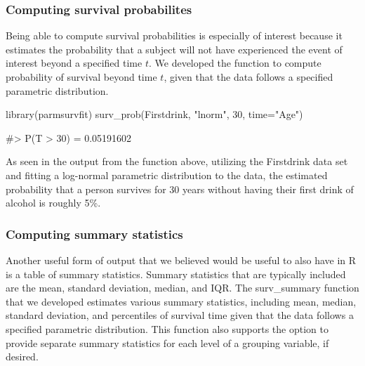 \hypertarget{computing-survival-probabilites}{%
\subsubsection{Computing survival
probabilites}\label{computing-survival-probabilites}}

Being able to compute survival probabilities is especially of interest
because it estimates the probability that a subject will not have
experienced the event of interest beyond a specified time \(t\). We
developed the function  to compute probability of
survival beyond time \(t\), given that the data follows a specified
parametric distribution.

\begin{Schunk}
\begin{Sinput}
library(parmsurvfit)
surv_prob(Firstdrink, "lnorm", 30, time="Age")
\end{Sinput}
\begin{Soutput}
#> P(T > 30) = 0.05191602
\end{Soutput}
\end{Schunk}

As seen in the output from the function above, utilizing the Firstdrink
data set and fitting a log-normal parametric distribution to the data,
the estimated probability that a person survives for 30 years without
having their first drink of alcohol is roughly 5\%.

\hypertarget{computing-summary-statistics}{%
\subsubsection{Computing summary
statistics}\label{computing-summary-statistics}}

Another useful form of output that we believed would be useful to also
have in R is a table of summary statistics. Summary statistics that are
typically included are the mean, standard deviation, median, and IQR.
The surv\_summary function that we developed estimates various summary
statistics, including mean, median, standard deviation, and percentiles
of survival time given that the data follows a specified parametric
distribution. This function also supports the option to provide separate
summary statistics for each level of a grouping variable, if desired.


